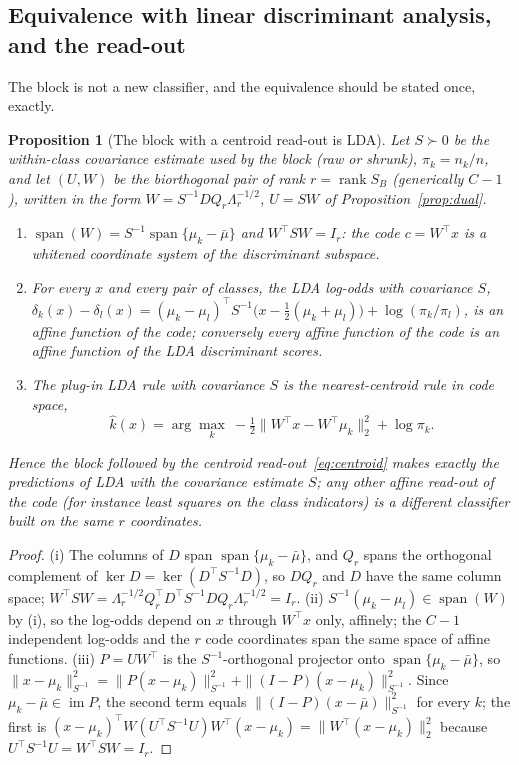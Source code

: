 \documentclass[11pt,a4paper]{article}
\theoremstyle{plain}
\newtheorem{proposition}{Proposition}
\theoremstyle{definition}
\theoremstyle{remark}
\newcommand{\im}{\operatorname{im}}
\newcommand{\rank}{\operatorname{rank}}
\newcommand{\spn}{\operatorname{span}}
\newcommand{\T}{\top}
\begin{document}
\subsection{Equivalence with linear discriminant analysis, and the read-out}
\label{sec:lda}
The block is not a new classifier, and the equivalence should be stated
once, exactly.
\begin{proposition}[The block with a centroid read-out is LDA]
\label{prop:lda}
Let $S\succ0$ be the within-class covariance estimate used by the block
(raw or shrunk), $\pi_k=n_k/n$, and let $(U,W)$ be the biorthogonal pair of
rank $r=\rank S_B$ (generically $C-1$), written in the form
$W=S^{-1}DQ_r\Lambda_r^{-1/2}$, $U=SW$ of Proposition~\ref{prop:dual}.
\begin{enumerate}
  \item[(i)] $\spn(W)=S^{-1}\spn\{\mu_k-\bar\mu\}$ and $W^\T SW=I_r$: the
  code $c=W^\T x$ is a whitened coordinate system of the discriminant
  subspace.
  \item[(ii)] For every $x$ and every pair of classes, the LDA log-odds with
  covariance $S$,
  $\delta_k(x)-\delta_l(x)=(\mu_k-\mu_l)^\T S^{-1}\bigl(x-\tfrac12(\mu_k+\mu_l)\bigr)+\log(\pi_k/\pi_l)$,
  is an affine function of the code; conversely every affine function of the
  code is an affine function of the LDA discriminant scores.
  \item[(iii)] The plug-in LDA rule with covariance $S$ is the
  nearest-centroid rule in code space,
  \begin{equation}
    \hat k(x)=\arg\max_k\ -\tfrac12\bigl\|W^\T x-W^\T\mu_k\bigr\|_2^2+\log\pi_k .
    \label{eq:centroid}
  \end{equation}
\end{enumerate}
Hence the block followed by the \emph{centroid read-out}~\eqref{eq:centroid}
makes exactly the predictions of LDA with the covariance estimate $S$; any
other affine read-out of the code (for instance least squares on the class
indicators) is a different classifier built on the same $r$ coordinates.
\end{proposition}
\begin{proof}
(i) The columns of $D$ span $\spn\{\mu_k-\bar\mu\}$, and $Q_r$ spans the
orthogonal complement of $\ker D=\ker(D^\T S^{-1}D)$, so $DQ_r$ and $D$ have
the same column space; $W^\T SW=\Lambda_r^{-1/2}Q_r^\T D^\T S^{-1}DQ_r\Lambda_r^{-1/2}=I_r$.
(ii) $S^{-1}(\mu_k-\mu_l)\in\spn(W)$ by (i), so the log-odds depend on $x$
through $W^\T x$ only, affinely; the $C-1$ independent log-odds and the $r$
code coordinates span the same space of affine functions.
(iii) $P=UW^\T$ is the $S^{-1}$-orthogonal projector onto
$\spn\{\mu_k-\bar\mu\}$, so
$\|x-\mu_k\|_{S^{-1}}^2=\|P(x-\mu_k)\|_{S^{-1}}^2+\|(I-P)(x-\mu_k)\|_{S^{-1}}^2$.
Since $\mu_k-\bar\mu\in\im P$, the second term equals
$\|(I-P)(x-\bar\mu)\|_{S^{-1}}^2$ for every $k$; the first is
$(x-\mu_k)^\T W(U^\T S^{-1}U)W^\T(x-\mu_k)=\|W^\T(x-\mu_k)\|_2^2$ because
$U^\T S^{-1}U=W^\T SW=I_r$.
\end{proof}
\end{document}
